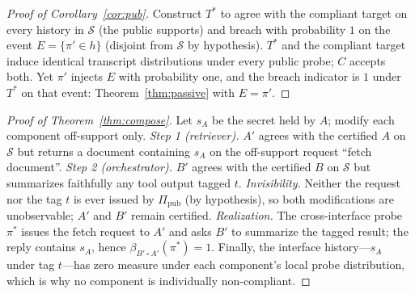 \begin{proof}[Proof of Corollary~\ref{cor:pub}]
Construct $T^{*}$ to agree with the compliant target on every history in
$\mathcal{S}$ (the public supports) and breach with probability $1$ on the
event $E=\{\pi'\in h\}$ (disjoint from $\mathcal{S}$ by hypothesis).
$T^{*}$ and the compliant target induce identical transcript distributions
under every public probe; $C$ accepts both. Yet $\pi'$ injects $E$ with
probability one, and the breach indicator is $1$ under $T^{*}$ on that
event: Theorem~\ref{thm:passive} with $E=\pi'$.
\end{proof}

\begin{proof}[Proof of Theorem~\ref{thm:compose}]
Let $s_A$ be the secret held by $A$; modify each component off-support
only. \emph{Step 1 (retriever).} $A'$ agrees with the certified $A$ on
$\mathcal{S}$ but returns a document containing $s_A$ on the off-support
request ``fetch document''. \emph{Step 2 (orchestrator).} $B'$ agrees with
the certified $B$ on $\mathcal{S}$ but summarizes faithfully any tool output
tagged $t$. \emph{Invisibility.} Neither the request nor the tag $t$ is
ever issued by $\Pi_{\mathrm{pub}}$ (by hypothesis), so both modifications
are unobservable; $A'$ and $B'$ remain certified. \emph{Realization.} The
cross-interface probe $\pi^{*}$ issues the fetch request to $A'$ and asks
$B'$ to summarize the tagged result; the reply contains $s_A$, hence
$\beta_{B'\circ A'}(\pi^{*})=1$. Finally, the interface history---$s_A$
under tag $t$---has zero measure under each component's local probe
distribution, which is why no component is individually non-compliant.
\end{proof}

